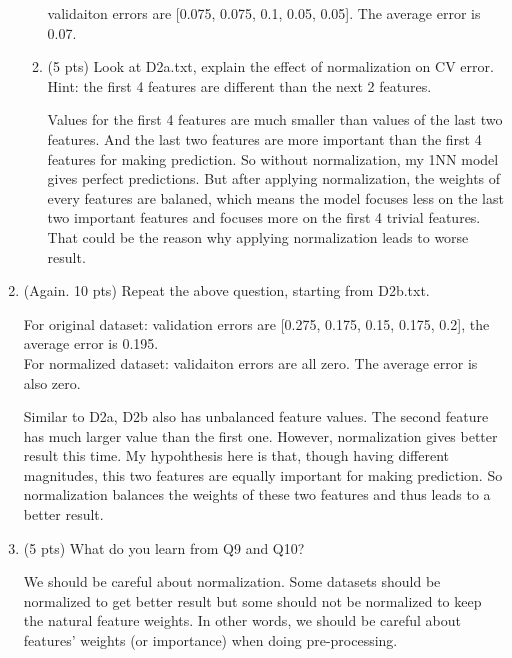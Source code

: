 \documentclass[a4paper]{article}
\theoremstyle{definition}
\newenvironment{soln}{
    \leavevmode\color{blue}\ignorespaces
}{}
\begin{document}
\begin{enumerate}
\begin{enumerate}
\begin{soln}  
validaiton errors are [0.075, 0.075, 0.1, 0.05, 0.05]. The average error is 0.07.
\end{soln}

  \item (5 pts) Look at D2a.txt, explain the effect of normalization on CV error.  Hint: the first 4 features are different than the next 2 features.

\begin{soln}  
Values for the first 4 features are much smaller than values of the last two features. And the last two features are more important than the first 4 features for making prediction. So without normalization, my 1NN model gives perfect predictions. But after applying normalization, the weights of every features are balaned, which means the model focuses less on the last two important features and focuses more on the first 4 trivial features. That could be the reason why applying normalization leads to worse result.
\end{soln}

  \end{enumerate}

\item (Again.  10 pts)
Repeat the above question, starting from D2b.txt.

\begin{soln} 
For original dataset: validation errors are [0.275, 0.175, 0.15, 0.175, 0.2], the average error is 0.195.\\
For normalized dataset: validaiton errors are all zero. The average error is also zero.

Similar to D2a, D2b also has unbalanced feature values. The second feature has much larger value than the first one. However, normalization gives better result this time. My hypohthesis here is that, though having different magnitudes, this two features are equally important for making prediction. So normalization balances the weights of these two features and thus leads to a better result.
\end{soln}

\item (5 pts) What do you learn from Q9 and Q10?


\begin{soln}  
We should be careful about normalization. Some datasets should be normalized to get better result but some should not be normalized to keep the natural feature weights. In other words, we should be careful about features' weights (or importance) when doing pre-processing. 
\end{soln}


\end{enumerate}
\end{document}
